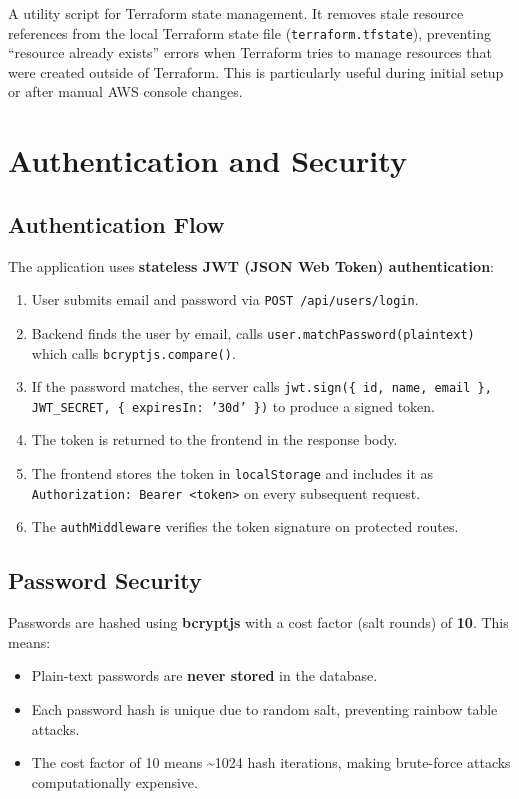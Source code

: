 \documentclass[12pt,a4paper]{report}
\begin{document}
A utility script for Terraform state management. It removes stale resource references from the local Terraform state file (\texttt{terraform.tfstate}), preventing ``resource already exists'' errors when Terraform tries to manage resources that were created outside of Terraform. This is particularly useful during initial setup or after manual AWS console changes.

\chapter{Authentication and Security}

\section{Authentication Flow}

The application uses \textbf{stateless JWT (JSON Web Token) authentication}:

\begin{enumerate}[leftmargin=2em]
  \item User submits email and password via \texttt{POST /api/users/login}.
  \item Backend finds the user by email, calls \texttt{user.matchPassword(plaintext)} which calls \texttt{bcryptjs.compare()}.
  \item If the password matches, the server calls \texttt{jwt.sign(\{ id, name, email \}, JWT\_SECRET, \{ expiresIn: '30d' \})} to produce a signed token.
  \item The token is returned to the frontend in the response body.
  \item The frontend stores the token in \texttt{localStorage} and includes it as \texttt{Authorization: Bearer <token>} on every subsequent request.
  \item The \texttt{authMiddleware} verifies the token signature on protected routes.
\end{enumerate}

\section{Password Security}

Passwords are hashed using \textbf{bcryptjs} with a cost factor (salt rounds) of \textbf{10}. This means:
\begin{itemize}[leftmargin=2em]
  \item Plain-text passwords are \textbf{never stored} in the database.
  \item Each password hash is unique due to random salt, preventing rainbow table attacks.
  \item The cost factor of 10 means \textasciitilde 1024 hash iterations, making brute-force attacks computationally expensive.
\end{itemize}
\end{document}
